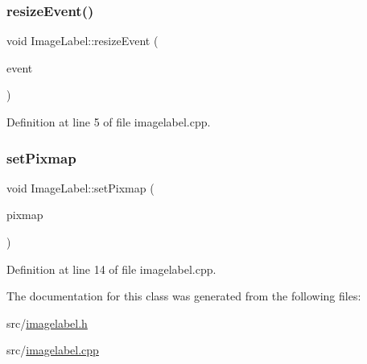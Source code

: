 \subsubsection{\texorpdfstring{resizeEvent()}{resizeEvent()}}
{\footnotesize\ttfamily void Image\+Label\+::resize\+Event (\begin{DoxyParamCaption}\item[{Q\+Resize\+Event $\ast$}]{event }\end{DoxyParamCaption})\hspace{0.3cm}{\ttfamily [protected]}}



Definition at line 5 of file imagelabel.\+cpp.

\mbox{\label{class_image_label_a31004072fa6922806359c845c89fb2bc}} 
\subsubsection{\texorpdfstring{setPixmap}{setPixmap}}
{\footnotesize\ttfamily void Image\+Label\+::set\+Pixmap (\begin{DoxyParamCaption}\item[{const Q\+Pixmap \&}]{pixmap }\end{DoxyParamCaption})\hspace{0.3cm}{\ttfamily [slot]}}



Definition at line 14 of file imagelabel.\+cpp.



The documentation for this class was generated from the following files\+:\begin{DoxyCompactItemize}
\item 
src/\mbox{\hyperlink{imagelabel_8h}{imagelabel.\+h}}\item 
src/\mbox{\hyperlink{imagelabel_8cpp}{imagelabel.\+cpp}}\end{DoxyCompactItemize}
